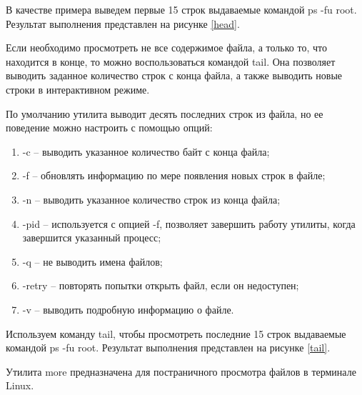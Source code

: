 В качестве примера выведем первые 15 строк выдаваемые командой ps -fu root. Результат выполнения представлен на рисунке \ref{head}.


Если необходимо просмотреть не все содержимое файла, а только то, что находится в конце, то можно воспользоваться командой tail.  Она позволяет выводить заданное количество строк с конца файла, а также выводить новые строки в интерактивном режиме.

По умолчанию утилита выводит десять последних строк из файла, но ее поведение можно настроить с помощью опций:
\begin{enumerate}
    \item -c -- выводить указанное количество байт с конца файла;
    \item -f -- обновлять информацию по мере появления новых строк в файле;
    \item -n -- выводить указанное количество строк из конца файла;
    \item -pid -- используется с опцией -f, позволяет завершить работу утилиты, когда завершится указанный процесс;
    \item -q -- не выводить имена файлов;
    \item -retry -- повторять попытки открыть файл, если он недоступен;
    \item -v -- выводить подробную информацию о файле.
\end{enumerate}

Используем команду tail, чтобы просмотреть последние 15 строк выдаваемые командой ps -fu root. Результат выполнения представлен на рисунке \ref{tail}.


Утилита more предназначена для постраничного просмотра файлов в терминале Linux.

